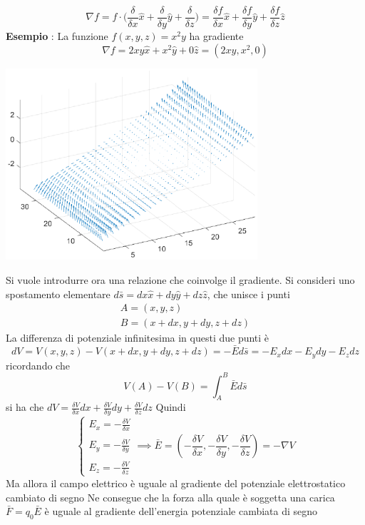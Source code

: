 \documentclass[10pt, letterpaper]{report}
\begin{document}
$$ \nabla f = f\cdot\Big( 
    \dfrac{\delta}{\delta x}\hat x+\dfrac{\delta}{\delta y}\hat y+\dfrac{\delta}{\delta z}    
\Big)= \dfrac{\delta f}{\delta x}\hat x+\dfrac{\delta f}{\delta y}\hat y+\dfrac{\delta f}{\delta z}\hat z$$
\textbf{Esempio} : La funzione $f(x,y,z)=x^2y$ ha gradiente 
$$ \nabla f = 2xy\hat x + x^2\hat y + 0\hat z = (2xy,x^2,0) $$
\begin{center}
    \includegraphics[width=0.7\textwidth]{images/grad.eps}
\end{center}
Si vuole introdurre ora una relazione che coinvolge il gradiente. Si consideri uno spostamento elementare $d\bar s = dx \hat x + dy\hat y +dz\hat z$, che unisce i punti 
$$\begin{matrix}
    A = (x,y,z)\\ 
    B= (x+dx,y+dy,z+dz)
\end{matrix}$$ 
La differenza di potenziale infinitesima in questi due punti è 
$$ dV=V(x,y,z)-V(x+dx,y+dy,z+dz)=-\bar E d\bar s = -E_x dx - E_y dy - E_z dz$$
ricordando che 
$$ V(A)-V(B)=\int_A^B \bar E d\bar s$$ 
si ha che 
$dV=\frac{\delta V}{\delta x}dx+\frac{\delta V}{\delta y}dy+\frac{\delta V}{\delta z}dz$
Quindi 
$$ \begin{cases}
    E_x=-\displaystyle\frac{\delta V}{\delta x}\\  \\
    E_y=-\displaystyle\frac{\delta V}{\delta y}\\  \\
    E_z=-\displaystyle\frac{\delta V}{\delta z}
\end{cases}\implies \bar E = (-\frac{\delta V}{\delta x},-\frac{\delta V}{\delta y},-\frac{\delta V}{\delta z})=-\nabla V$$
Ma allora il campo elettrico è uguale al gradiente del potenziale elettrostatico cambiato di segno
Ne consegue che la forza alla quale è soggetta una carica $\bar F = q_0\bar E$ è uguale al gradiente dell'energia potenziale cambiata di segno 
\end{document}
